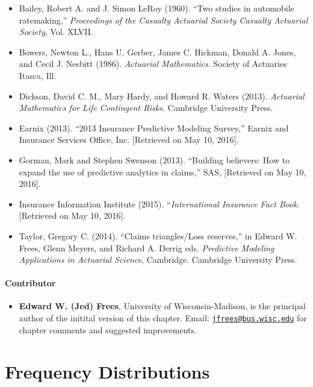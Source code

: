 \documentclass[]{book}
\providecommand{\tightlist}{%
  \setlength{\itemsep}{0pt}\setlength{\parskip}{0pt}}
\theoremstyle{definition}
\theoremstyle{definition}
\theoremstyle{definition}
\theoremstyle{remark}
\begin{document}
\begin{itemize}
\item
  Bailey, Robert A. and J. Simon LeRoy (1960). ``Two studies in
  automobile ratemaking,'' \emph{Proceedings of the Casualty Actuarial
  Society Casualty Actuarial Society}, Vol. XLVII.
\item
  Bowers, Newton L., Hans U. Gerber, James C. Hickman, Donald A. Jones,
  and Cecil J. Nesbitt (1986). \emph{Actuarial Mathematics}. Society of
  Actuaries Itasca, Ill.
\item
  Dickson, David C. M., Mary Hardy, and Howard R. Waters (2013).
  \emph{Actuarial Mathematics for Life Contingent Risks}. Cambridge
  University Press.
\item
  Earnix (2013). ``2013 Insurance Predictive Modeling Survey,'' Earnix
  and Insurance Services Office, Inc. {[}Retrieved on May 10, 2016{]}.
\item
  Gorman, Mark and Stephen Swenson (2013). ``Building believers: How to
  expand the use of predictive analytics in claims,'' SAS, {[}Retrieved
  on May 10, 2016{]}.
\item
  Insurance Information Institute (2015). ``\emph{International
  Insurance Fact Book}. {[}Retrieved on May 10, 2016{]}.
\item
  Taylor, Gregory C. (2014). ``Claims triangles/Loss reserves,'' in
  Edward W. Frees, Glenn Meyers, and Richard A. Derrig eds.
  \emph{Predictive Modeling Applications in Actuarial Science},
  Cambridge. Cambridge University Press.
\end{itemize}

\subsubsection*{Contributor}\label{contributor}

\begin{itemize}
\tightlist
\item
  \textbf{Edward W. (Jed) Frees}, University of Wisconsin-Madison, is
  the principal author of the initital version of this chapter. Email:
  \href{mailto:jfrees@bus.wisc.edu}{\nolinkurl{jfrees@bus.wisc.edu}} for
  chapter comments and suggested improvements.
\end{itemize}

\chapter{Frequency Distributions}\label{frequency-distributions}
\end{document}

